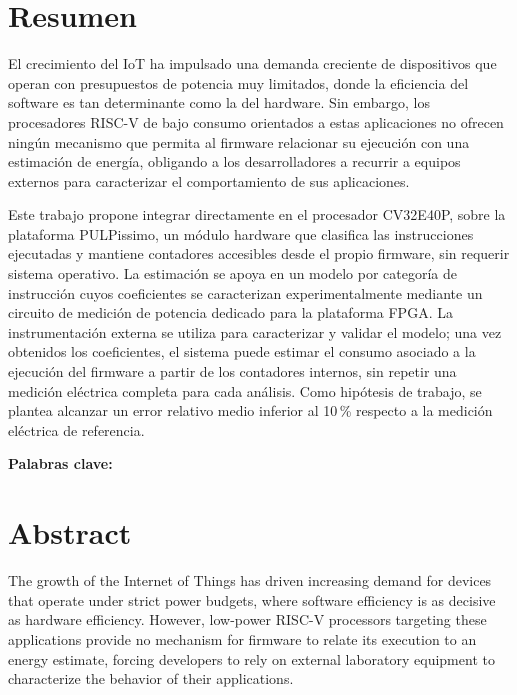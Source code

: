 \chapter*{Resumen}
\thispagestyle{empty}

El crecimiento del IoT ha impulsado una demanda creciente de
dispositivos que operan con presupuestos de potencia muy limitados, donde la
eficiencia del software es tan determinante como la del hardware. Sin embargo,
los procesadores RISC-V de bajo consumo orientados a estas aplicaciones no
ofrecen ningún mecanismo que permita al firmware relacionar su ejecución con una
estimación de energía, obligando a los desarrolladores a recurrir a
equipos externos para caracterizar el comportamiento de sus
aplicaciones.

Este trabajo propone integrar directamente en el procesador CV32E40P, sobre la
plataforma PULPissimo, un módulo hardware que clasifica las instrucciones
ejecutadas y mantiene contadores accesibles desde el propio firmware, sin
requerir sistema operativo. La estimación se apoya en un modelo por categoría
de instrucción cuyos coeficientes se caracterizan experimentalmente mediante un
circuito de medición de potencia dedicado para la plataforma FPGA. La
instrumentación externa se utiliza para caracterizar y validar el modelo; una
vez obtenidos los coeficientes, el sistema puede estimar el consumo asociado a
la ejecución del firmware a partir de los contadores internos, sin repetir una
medición eléctrica completa para cada análisis. Como hipótesis de trabajo, se
plantea alcanzar un error relativo medio inferior al 10\,\% respecto a la
medición eléctrica de referencia.

\bigskip
\textbf{Palabras clave:} \scriptKeywords

\clearpage
\chapter*{Abstract}
\thispagestyle{empty}

The growth of the Internet of Things has driven increasing demand for devices
that operate under strict power budgets, where software efficiency is as
decisive as hardware efficiency. However, low-power RISC-V processors targeting
these applications provide no mechanism for firmware to relate its execution to
an energy estimate, forcing developers to rely on external laboratory equipment
to characterize the behavior of their applications.

